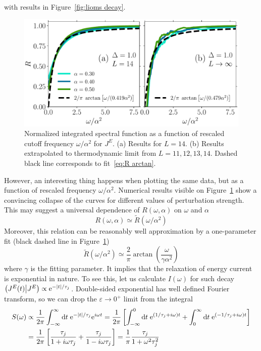 with results in Figure~\ref{fig:lioms decay}.
\begin{figure}[ht]
  \centering
  \includegraphics[width=\figsize\textwidth]{Figures/current_scaling_small.pdf}
  \caption{Normalized integrated spectral function as a function of rescaled cutoff frequency \(\omega/\alpha^2\)
   for \(J^E\). (a) Results for \(L=14\). (b) Results extrapolated to thermodynamic limit from \(L=11,12,13,14\).
  Dashed black line corresponds to fit~\eqref{eq:R arctan}.}
  \label{fig:current decay scaling}
\end{figure}
However, an interesting thing happens when plotting the same data, but as a function of rescaled
frequency \(\omega/\alpha^2\). Numerical results visible on Figure~\ref{fig:current decay scaling}
show a convincing collapse of the curves for different values of perturbation strength. This may suggest
a universal dependence of \(R(\omega,\alpha)\) on \(\omega\) and \(\alpha\)
\begin{equation}
  R(\omega,\alpha)\simeq \tilde{R}(\omega/\alpha^2)
  \label{eq:universal scaling current}
\end{equation}
Moreover, this relation can be reasonably well approximation by a one-parameter fit
(black dashed line in Figure~\ref{fig:current decay scaling})
\begin{equation}
  \tilde{R}(\omega/\alpha^2) \simeq \frac{2}{\pi} \arctan\left(\frac{\omega}{\gamma \alpha^2}\right)
\label{eq:R arctan}
\end{equation}
where \(\gamma \) is the fitting parameter. It implies that the relaxation of energy current
is exponential in nature. To see this, let us calculate \(I(\omega)\) for such decay
\(\left(J^E(t) \middle| J^E\right) \propto \mathrm{e}^{-\abs{t}/\tau_{j}}\). Double-sided exponential has well defined Fourier
transform, so we can drop the \(\varepsilon \to 0^{+}\) limit from the integral
\begin{align}
  S(\omega) &\propto \frac{1}{2\pi} \int_{-\infty}^{\infty} \mathrm{d} t\; \mathrm{e}^{-\abs{t}/\tau_{j}} \mathrm{e}^{i \omega t} = 
  \frac{1}{2\pi} \left[\int_{-\infty}^{0} \mathrm{d} t\; \mathrm{e}^{(1/\tau_{j} + i\omega)t }
  + \int_{0}^{\infty} \mathrm{d} t\; \mathrm{e}^{(-1/\tau_{j} + i\omega)t }  \right] \nonumber \\
  &= \frac{1}{2\pi} \left[\frac{\tau_{j}}{1+i\omega \tau_{j}} + \frac{\tau_{j}}{1-i\omega\tau_{j}}\right] = 
  \frac{1}{\pi} \frac{\tau_{j}}{1+\omega^2\tau_{j}^2}
\end{align}
